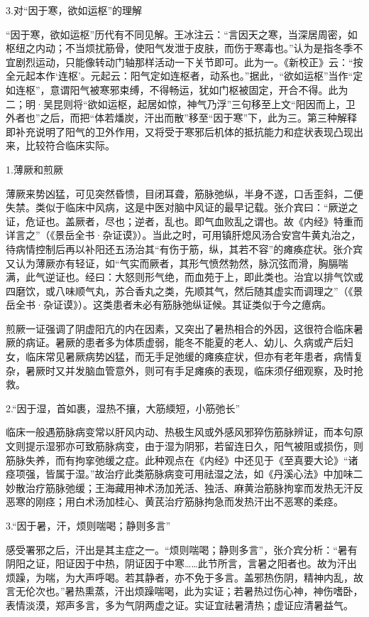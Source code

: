 \documentclass[draft,12pt]{ctexbook}
\begin{document}
3.对“因于寒，欲如运枢”的理解

“因于寒，欲如运枢”历代有不同见解。王冰注云：“言因天之寒，当深居周密，如枢纽之内动；不当烦扰筋骨，使阳气发泄于皮肤，而伤于寒毒也。”认为是指冬季不宜剧烈运动，只能像转动门轴那样活动一下关节即可。此为一。《新校正》云：“按全元起本作‘连枢’。元起云：阳气定如连枢者，动系也。”据此，“欲如运枢”当作“定如连枢”，意谓阳气被寒邪束缚，不得畅运，犹如门枢被固定，开合不得。此为二；明·吴昆则将“欲如运枢，起居如惊，神气乃浮”三句移至上文“阳因而上，卫外者也”之后，而把“体若燔炭，汗出而散”移至“因于寒”下，此为三。第三种解释即补充说明了阳气的卫外作用，又将受于寒邪后机体的抵抗能力和症状表现凸现出来，比较符合临床实际。


1.薄厥和煎厥

薄厥来势凶猛，可见突然昏愦，目闭耳聋，筋脉弛纵，半身不遂，口舌歪斜，二便失禁。类似于临床中风病，这是中医对脑中风证的最早记载。张介宾曰：“厥逆之证，危证也。盖厥者，尽也；逆者，乱也。即气血败乱之谓也。故《内经》特重而详言之”（《景岳全书·杂证谟》）。当此之时，可用镇肝熄风汤合安宫牛黄丸治之，待病情控制后再以补阳还五汤治其“有伤于筋，纵，其若不容”的瘫痪症状。张介宾又认为薄厥亦有轻证，如“气实而厥者，其形气愤然勃然，脉沉弦而滑，胸膈喘满，此气逆证也。经曰：大怒则形气绝，而血苑于上，即此类也。治宜以排气饮或四磨饮，或八味顺气丸，苏合香丸之类，先顺其气，然后随其虚实而调理之”（《景岳全书·杂证谟》）。这类患者未必有筋脉弛纵证候。其证类似于今之癔病。

煎厥一证强调了阴虚阳亢的内在因素，又突出了暑热相合的外因，这很符合临床暑厥的病证。暑厥的患者多为体质虚弱，能冬不能夏的老人、幼儿、久病或产后妇女，临床常见暑厥病势凶猛，而无手足弛缓的瘫痪症状，但亦有老年患者，病情复杂，暑厥时又并发脑血管意外，则可有手足瘫痪的表现，临床须仔细观察，及时抢救。

2.“因于湿，首如裹，湿热不攘，大筋緛短，小筋弛长”

临床一般遇筋脉病变常以肝风内动、热极生风或外感风邪猝伤筋脉辨证，而本句原文则提示湿邪亦可致筋脉病变，由于湿为阴邪，若留连日久，阳气被阻或损伤，则筋脉失养，而有拘挛弛缓之症。此种观点在《内经》中还见于《至真要大论》“诸痉项强，皆属于湿。”故治疗此类筋脉病变可用祛湿之法，如《丹溪心法》中加味二妙散治疗筋脉弛缓；王海藏用神术汤加羌活、独活、麻黄治筋脉拘挛而发热无汗反恶寒的刚痉；用白术汤加桂心、黄芪治疗筋脉拘急而发热汗出不恶寒的柔痉。

3.“因于暑，汗，烦则喘喝；静则多言”

感受署邪之后，汗出是其主症之一。“烦则喘喝；静则多言”，张介宾分析：“暑有阴阳之证，阳证因于中热，阴证因于中寒……此节所言，言暑之阳者也。故为汗出烦躁，为喘，为大声呼喝。若其静者，亦不免于多言。盖邪热伤阴，精神内乱，故言无伦次也。”暑热熏蒸，汗出烦躁喘喝，此为实证；若暑热过伤心神，神伤嗜卧，表情淡漠，郑声多言，多为气阴两虚之证。实证宜祛暑清热；虚证应清暑益气。
\end{document}
